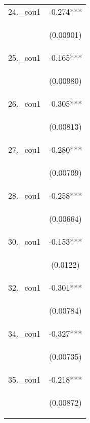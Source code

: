 \documentclass[]{article}
\begin{document}
\begin{center}
\begin{tabular}{lc}
24.\_cou1 & -0.274*** \\
\vspace{4pt} & \begin{footnotesize}(0.00901)\end{footnotesize} \\
25.\_cou1 & -0.165*** \\
\vspace{4pt} & \begin{footnotesize}(0.00980)\end{footnotesize} \\
26.\_cou1 & -0.305*** \\
\vspace{4pt} & \begin{footnotesize}(0.00813)\end{footnotesize} \\
27.\_cou1 & -0.280*** \\
\vspace{4pt} & \begin{footnotesize}(0.00709)\end{footnotesize} \\
28.\_cou1 & -0.258*** \\
\vspace{4pt} & \begin{footnotesize}(0.00664)\end{footnotesize} \\
30.\_cou1 & -0.153*** \\
\vspace{4pt} & \begin{footnotesize}(0.0122)\end{footnotesize} \\
32.\_cou1 & -0.301*** \\
\vspace{4pt} & \begin{footnotesize}(0.00784)\end{footnotesize} \\
34.\_cou1 & -0.327*** \\
\vspace{4pt} & \begin{footnotesize}(0.00735)\end{footnotesize} \\
35.\_cou1 & -0.218*** \\
\vspace{4pt} & \begin{footnotesize}(0.00872)\end{footnotesize} \\

\end{tabular}
\end{center}
\end{document}
